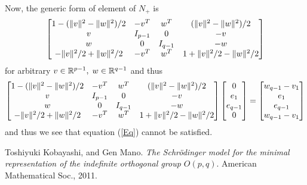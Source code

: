 \documentclass[10pt]{article} %
\begin{document}
Now, the generic form of element of $N_+$ is
\[\begin{bmatrix}1-(\|v\|^2-\|w\|^2)/2&-v^T&w^T&(\|v\|^2-\|w\|^2)/2\\v&I_{p-1}&0&-v\\w&0&I_{q-1}&-w\\-\|v\|^2/2+\|w\|^2/2&
	-v^T&w^T&1+\|v\|^2/2-\|w\|^2/2\end{bmatrix}\]
	for arbitrary $v\in\mathbb{R}^{p-1},\;w\in\mathbb{R}^{q-1}$ and thus
\[\begin{bmatrix}1-(\|v\|^2-\|w\|^2)/2&-v^T&w^T&(\|v\|^2-\|w\|^2)/2\\v&I_{p-1}&0&-v\\w&0&I_{q-1}&-w\\-\|v\|^2/2+\|w\|^2/2&
	-v^T&w^T&1+\|v\|^2/2-\|w\|^2/2\end{bmatrix}\begin{bmatrix}0\\e_1\\e_{q-1}\\0\end{bmatrix}=
		\begin{bmatrix}
			w_{q-1}-v_1\\e_1\\e_{q-1}\\w_{q-1}-v_1
		\end{bmatrix}\]
		and thus we see that equation (\ref{Eq}) cannot be satisfied.
\begin{thebibliography}{9}
Toshiyuki Kobayashi, and Gen Mano. 
	{\em The Schrödinger model for the minimal representation of the indefinite orthogonal group $O(p, q)$}. American Mathematical Soc., 2011.
\end{thebibliography}
\end{document}
